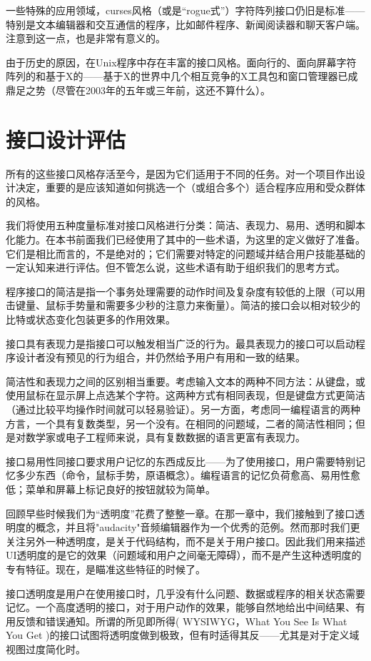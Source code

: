 \documentclass[12pt,oneside]{book}
\begin{document}
\begin{common-format}
一些特殊的应用领域，curses风格（或是“rogue式”）字符阵列接口仍旧是标准——特别是文本编辑器和交互通信的程序，比如邮件程序、新闻阅读器和聊天客户端。注意到这一点，也是非常有意义的。

由于历史的原因，在Unix程序中存在丰富的接口风格。面向行的、面向屏幕字符阵列的和基于X的——基于X的世界中几个相互竞争的X工具包和窗口管理器已成鼎足之势（尽管在2003年的五年或三年前，这还不算什么）。

\section{接口设计评估}
所有的这些接口风格存活至今，是因为它们适用于不同的任务。对一个项目作出设计决定，重要的是应该知道如何挑选一个（或组合多个）适合程序应用和受众群体的风格。

我们将使用五种度量标准对接口风格进行分类：简洁、表现力、易用、透明和脚本化能力。在本书前面我们已经使用了其中的一些术语，为这里的定义做好了准备。它们是相比而言的，不是绝对的；它们需要对特定的问题域并结合用户技能基础的一定认知来进行评估。但不管怎么说，这些术语有助于组织我们的思考方式。

程序接口的简洁是指一个事务处理需要的动作时间及复杂度有较低的上限（可以用击键量、鼠标手势量和需要多少秒的注意力来衡量）。简洁的接口会以相对较少的比特或状态变化包装更多的作用效果。

接口具有表现力是指接口可以触发相当广泛的行为。最具表现力的接口可以启动程序设计者没有预见的行为组合，并仍然给予用户有用和一致的结果。

简洁性和表现力之间的区别相当重要。考虑输入文本的两种不同方法：从键盘，或使用鼠标在显示屏上点选某个字符。这两种方式有相同表现，但是键盘方式更简洁（通过比较平均操作时间就可以轻易验证）。另一方面，考虑同一编程语言的两种方言，一个具有复数类型，另一个没有。在相同的问题域，二者的简洁性相同；但是对数学家或电子工程师来说，具有复数数据的语言更富有表现力。

接口易用性同接口要求用户记忆的东西成反比——为了使用接口，用户需要特别记忆多少东西（命令，鼠标手势，原语概念）。编程语言的记忆负荷愈高、易用性愈低；菜单和屏幕上标记良好的按钮就较为简单。

回顾早些时候我们为“透明度”花费了整整一章。在那一章中，我们接触到了接口透明度的概念，并且将"audacity"音频编辑器作为一个优秀的范例。然而那时我们更关注另外一种透明度，是关于代码结构，而不是关于用户接口。因此我们用来描述UI透明度的是它的效果（问题域和用户之间毫无障碍），而不是产生这种透明度的专有特征。现在，是瞄准这些特征的时候了。

接口透明度是用户在使用接口时，几乎没有什么问题、数据或程序的相关状态需要记忆。一个高度透明的接口，对于用户动作的效果，能够自然地给出中间结果、有用反馈和错误通知。所谓的所见即所得( WYSIWYG，What You See Is What You Get )的接口试图将透明度做到极致，但有时适得其反——尤其是对于定义域视图过度简化时。


\end{common-format}
\end{document}
